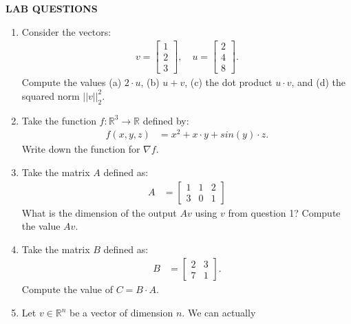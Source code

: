 \documentclass[12pt,hidelinks]{article}
\numberwithin{equation}{section}
\begin{document}
% 

\newpage

\textbf{LAB QUESTIONS}

\vspace*{0pt}

\begin{enumerate}
\item Consider the vectors:
\begin{align}
v = \begin{bmatrix} 1 \\ 2 \\ 3 \end{bmatrix}, \quad
u = \begin{bmatrix} 2 \\ 4 \\ 8 \end{bmatrix}.
\end{align}
Compute the values (a) $2 \cdot u$, (b) $u + v$, (c) the dot product $u \cdot v$,
and (d) the squared norm $|| v ||_2^2$.
\item Take the function $f: \mathbb{R}^3 \rightarrow \mathbb{R}$ defined by:
\begin{align}
f(x, y, z) &= x^2 + x \cdot y + sin(y) \cdot z.
\end{align}
Write down the function for $\nabla f$.
\item Take the matrix $A$ defined as:
\begin{align}
A &= \begin{bmatrix} 1 & 1 & 2 \\ 3 & 0 & 1 \end{bmatrix}
\end{align}
What is the dimension of the output $Av$ using $v$ from question 1? Compute
the value $Av$.
\item Take the matrix $B$ defined as:
\begin{align}
B &= \begin{bmatrix} 2 & 3 \\ 7 & 1 \end{bmatrix}.
\end{align}
Compute the value of $C = B \cdot A$.
\item Let $v \in \mathbb{R}^n$ be a vector of dimension $n$. We can actually

\end{enumerate}
\end{document}
